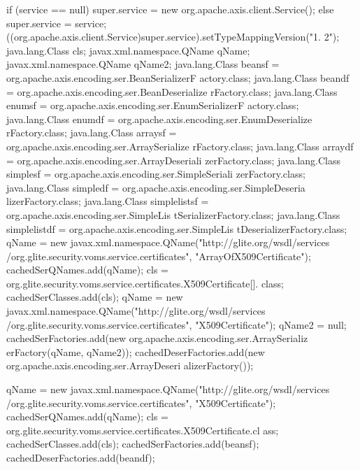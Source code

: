 \begin{DoxyCode}
                                                                                 
                                {
        if (service == null) {
            super.service = new org.apache.axis.client.Service();
        } else {
            super.service = service;
        }
        ((org.apache.axis.client.Service)super.service).setTypeMappingVersion("1.
      2");
            java.lang.Class cls;
            javax.xml.namespace.QName qName;
            javax.xml.namespace.QName qName2;
            java.lang.Class beansf = org.apache.axis.encoding.ser.BeanSerializerF
      actory.class;
            java.lang.Class beandf = org.apache.axis.encoding.ser.BeanDeserialize
      rFactory.class;
            java.lang.Class enumsf = org.apache.axis.encoding.ser.EnumSerializerF
      actory.class;
            java.lang.Class enumdf = org.apache.axis.encoding.ser.EnumDeserialize
      rFactory.class;
            java.lang.Class arraysf = org.apache.axis.encoding.ser.ArraySerialize
      rFactory.class;
            java.lang.Class arraydf = org.apache.axis.encoding.ser.ArrayDeseriali
      zerFactory.class;
            java.lang.Class simplesf = org.apache.axis.encoding.ser.SimpleSeriali
      zerFactory.class;
            java.lang.Class simpledf = org.apache.axis.encoding.ser.SimpleDeseria
      lizerFactory.class;
            java.lang.Class simplelistsf = org.apache.axis.encoding.ser.SimpleLis
      tSerializerFactory.class;
            java.lang.Class simplelistdf = org.apache.axis.encoding.ser.SimpleLis
      tDeserializerFactory.class;
            qName = new javax.xml.namespace.QName("http://glite.org/wsdl/services
      /org.glite.security.voms.service.certificates", "ArrayOfX509Certificate");
            cachedSerQNames.add(qName);
            cls = org.glite.security.voms.service.certificates.X509Certificate[].
      class;
            cachedSerClasses.add(cls);
            qName = new javax.xml.namespace.QName("http://glite.org/wsdl/services
      /org.glite.security.voms.service.certificates", "X509Certificate");
            qName2 = null;
            cachedSerFactories.add(new org.apache.axis.encoding.ser.ArraySerializ
      erFactory(qName, qName2));
            cachedDeserFactories.add(new org.apache.axis.encoding.ser.ArrayDeseri
      alizerFactory());

            qName = new javax.xml.namespace.QName("http://glite.org/wsdl/services
      /org.glite.security.voms.service.certificates", "X509Certificate");
            cachedSerQNames.add(qName);
            cls = org.glite.security.voms.service.certificates.X509Certificate.cl
      ass;
            cachedSerClasses.add(cls);
            cachedSerFactories.add(beansf);
            cachedDeserFactories.add(beandf);

    }
\end{DoxyCode}


